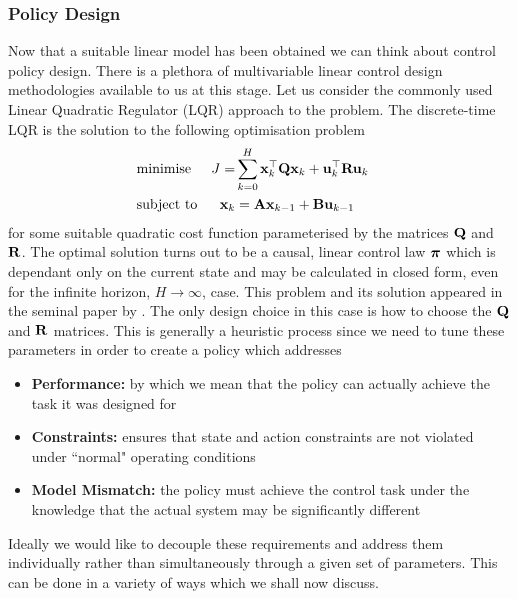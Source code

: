 \subsubsection{Policy Design}
Now that a suitable linear model has been obtained we can think about control policy design. There is a plethora of multivariable linear control design methodologies available to us at this stage. Let us consider the commonly used Linear Quadratic Regulator (LQR) approach to the problem. The discrete-time LQR is the solution to the following optimisation problem
\begin{align}
& \text{minimise} & J =  & \sum_{k=0}^{H}  \mathbf{x}_k^\top\mathbf{Q}\mathbf{x}_k + \mathbf{u}_k^\top\mathbf{R}\mathbf{u}_k && \label{eqn:lqr1} \\
&\text{subject to} & \mathbf{x}_{k} &= \mathbf{A}\mathbf{x}_{k-1} + \mathbf{B}\mathbf{u}_{k-1} && \label{eqn:lqr2}
\end{align}
for some suitable quadratic cost function parameterised by the matrices $\mathbf{Q}$ and $\mathbf{R}$. The optimal solution turns out to be a causal, linear control law $\boldsymbol{\pi}$ which is dependant only on the current state and may be calculated in closed form, even for the infinite horizon, $H \rightarrow \infty$, case. This problem and its solution appeared in the seminal paper by \cite{Kal60b}. The only design choice in this case is how to choose the $\mathbf{Q}$ and $\mathbf{R}$ matrices. This is generally a heuristic process since we need to tune these parameters in order to create a policy which addresses
\begin{itemize}
\item {\bf Performance:} by which we mean that the policy can actually achieve the task it was designed for
\item {\bf Constraints:} ensures that state and action constraints are not violated under ``normal" operating conditions
\item {\bf Model Mismatch:} the policy must achieve the control task under the knowledge that the actual system may be significantly different
\end{itemize}
Ideally we would like to decouple these requirements and address them individually rather than simultaneously through a given set of parameters. This can be done in a variety of ways which we shall now discuss. %
%


